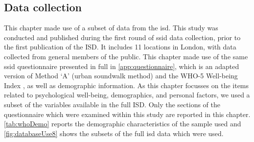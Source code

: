 \subsection{Data collection}
This chapter made use of a subset of data from the \gls{isd}. This study was conducted and published during the first round of \gls{ssid} data collection, prior to the first publication of the ISD. It includes 11 locations in London, with data collected from general members of the public. This chapter made use of the same \gls{ssid} questionnaire presented in full in \cref{app:questionnaire}, which is an adapted version of \citet{ISO12913Part2} Method `A' (urban soundwalk method) and the WHO-5 Well-being Index \citep{Hall2011Examining}, as well as demographic information. As this chapter focusses on the items related to psychological well-being, demographics, and personal factors, we used a subset of the variables available in the full ISD. Only the sections of the questionnaire which were examined within this study are reported in this chapter. \cref{tab:whoDemo} reports the demographic characteristics of the sample used and \cref{fig:databaseUse8} shows the subsets of the full \gls{isd} data which were used.


